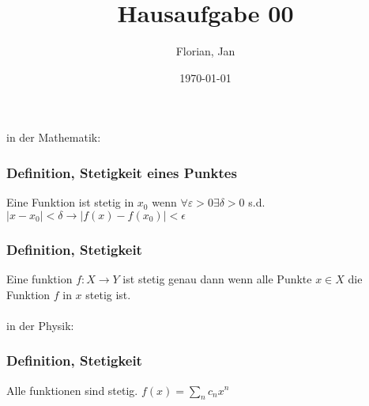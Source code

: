 \documentclass[]{scrartcl}
\title{Hausaufgabe 00}
\author{Florian, Jan}
\date{\today}
\begin{document}
\maketitle
\newpage
in der Mathematik:
\subsubsection*{Definition, Stetigkeit eines Punktes}
Eine Funktion ist stetig in $x_0$ wenn $\forall \varepsilon>0 \exists \delta>0$ s.d. $|x-x_0|<\delta \rightarrow |f(x)-f(x_0)| < \epsilon$
\subsubsection*{Definition, Stetigkeit}
Eine funktion $f: X\rightarrow Y$ ist stetig genau dann wenn alle Punkte $x\in X$ die Funktion $f$ in $x$ stetig ist.\\\\
in der Physik:
\subsubsection*{Definition, Stetigkeit}
Alle funktionen sind stetig. $f(x) = \sum_n c_n x^n$
\end{document}

